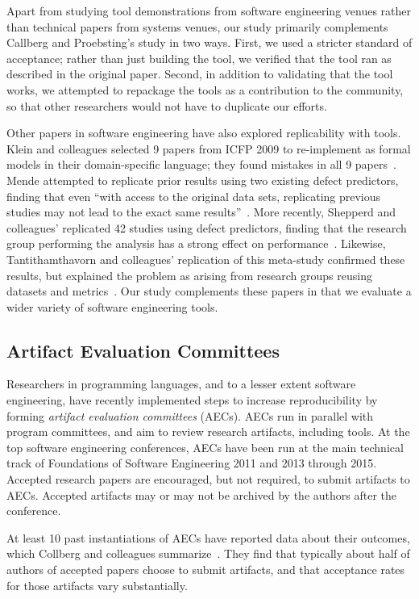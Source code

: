 \documentclass[10pt,conference]{IEEEtran}
\begin{document}
\noindent
Apart from studying tool demonstrations from software engineering venues
rather than technical papers from systems venues,
our study primarily complements Callberg and Proebsting's study in two
ways.
First, we used a stricter standard of acceptance; rather than just building
the tool, we verified that the tool ran as described in the original paper.
Second, in addition to validating that the tool works, we attempted to 
repackage the tools as a contribution to the community, so that other
researchers would not have to duplicate our efforts. 

Other papers in software engineering have also explored 
replicability with tools.
Klein and colleagues selected 9 papers from ICFP 2009 to
re-implement as formal models in their domain-specific language;
they found mistakes in all 9 papers~\cite{klein2012run}.
Mende attempted to replicate prior results using two 
existing defect predictors, finding that even
``with access to the original data sets, replicating
previous studies may not lead to the exact same results''~\cite{mende2010replication}.
More recently, Shepperd and colleagues' replicated 42 studies 
using defect predictors, finding that the research group 
performing the analysis has a strong effect on performance~\cite{shepperd}.
Likewise, Tantithamthavorn and colleagues' replication of this meta-study
confirmed these results, but explained the problem as arising from 
research groups reusing datasets and metrics~\cite{tantithamthavorn}.
Our study complements these papers in that we evaluate a wider
variety of software engineering tools.

\subsection{Artifact Evaluation Committees}

Researchers in programming languages, and to a lesser extent
software engineering, have recently implemented steps
to increase reproducibility by forming
\emph{artifact evaluation committees} (AECs).
AECs run in parallel with program committees,
and aim to review research artifacts, including tools.
At the top software engineering conferences,
AECs have been run at the main technical track of 
Foundations of Software Engineering 2011 and 2013 through 2015.
Accepted research papers are encouraged, but not required, to 
submit artifacts to AECs.
Accepted artifacts may or may not be archived by 
the authors after the conference.

At least 10 past instantiations of AECs have reported data about 
their outcomes, which Collberg and colleagues summarize~\cite{proebsting2015repeatability}.
They find that typically about half of authors of accepted papers
choose to submit artifacts, and that acceptance rates for those
artifacts vary substantially.
\end{document}
